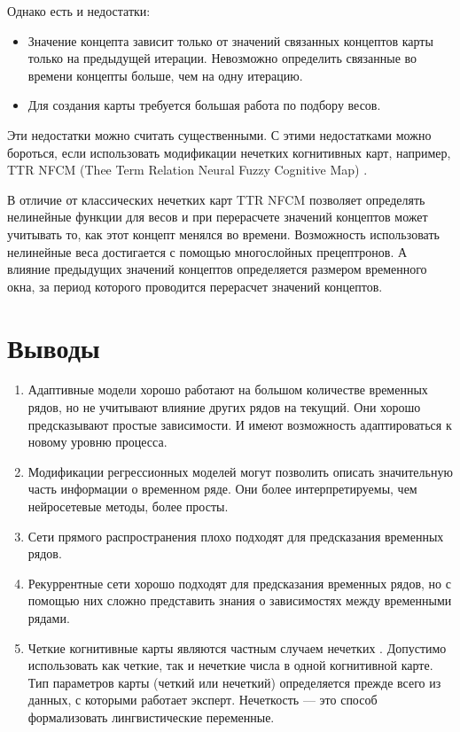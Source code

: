 Однако есть и недостатки:

\begin{itemize}
	\item Значение концепта зависит только от значений связанных концептов карты только на предыдущей итерации.
	Невозможно определить связанные во времени концепты больше, чем на одну итерацию.
	\item Для создания карты требуется большая работа по подбору весов.
\end{itemize}

Эти недостатки можно считать существенными.
С этими недостатками можно бороться, если использовать модификации нечетких когнитивных карт,
например, TTR NFCM (Thee Term Relation Neural Fuzzy Cognitive Map) \cite{threeTermNfcm}.

В отличие от классических нечетких карт TTR NFCM позволяет
определять нелинейные функции для весов и при перерасчете значений концептов может учитывать то, как
этот концепт менялся во времени. Возможность использовать нелинейные веса достигается с помощью многослойных прецептронов.
А влияние предыдущих значений концептов определяется размером временного окна, за период которого проводится перерасчет
значений концептов.


\section{Выводы}

\begin{enumerate}
	\item Адаптивные модели хорошо работают на большом количестве временных рядов,
	но не учитывают влияние других рядов на текущий. Они хорошо предсказывают простые зависимости.
	И имеют возможность адаптироваться к новому уровню процесса.
	\item Модификации регрессионных моделей могут позволить описать значительную
	часть информации о временном ряде. Они более интерпретируемы, чем нейросетевые методы, более просты.
	\item Сети прямого распространения плохо подходят для предсказания временных рядов.
	\item Рекуррентные сети хорошо подходят для предсказания временных рядов, но
	с помощью них сложно представить знания о зависимостях между временными рядами.
	\item Четкие когнитивные карты являются частным случаем нечетких \cite{kayashev2014cognitive}. Допустимо
	использовать как четкие, так и нечеткие числа в одной когнитивной карте.
	Тип параметров карты (четкий или нечеткий) определяется прежде всего
	из данных, с которыми работает эксперт. Нечеткость --- это способ формализовать
	лингвистические переменные.
\end{enumerate}


